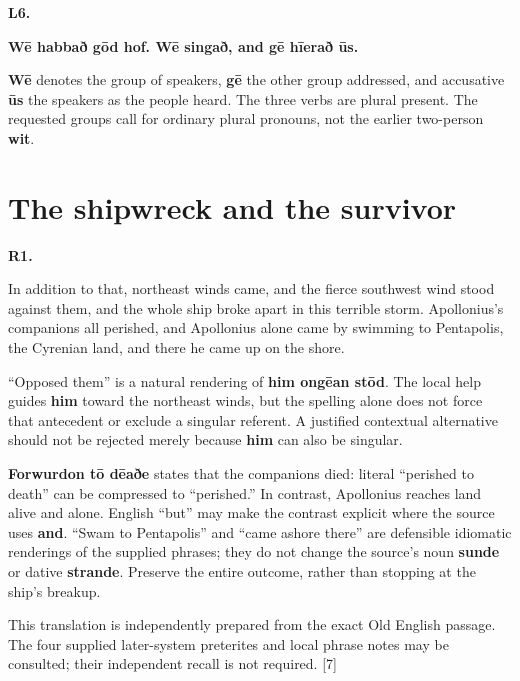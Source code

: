 \par\begin{minipage}{\linewidth}\raggedright
\textbf{L6.}

\textbf{Wē habbað gōd hof. Wē singað, and gē hīerað ūs.}

\textbf{Wē} denotes the group of speakers, \textbf{gē} the other group addressed, and accusative \textbf{ūs} the speakers as the people heard. The three verbs are plural present. The requested groups call for ordinary plural pronouns, not the earlier two-person \textbf{wit}.

\end{minipage}\par\addvspace{4pt}

\section*{The shipwreck and the survivor}

\par\begin{minipage}{\linewidth}\raggedright
\textbf{R1.}

In addition to that, northeast winds came, and the fierce southwest wind stood against them, and the whole ship broke apart in this terrible storm. Apollonius's companions all perished, and Apollonius alone came by swimming to Pentapolis, the Cyrenian land, and there he came up on the shore.

“Opposed them” is a natural rendering of \textbf{him ongēan stōd}. The local help guides \textbf{him} toward the northeast winds, but the spelling alone does not force that antecedent or exclude a singular referent. A justified contextual alternative should not be rejected merely because \textbf{him} can also be singular.

\textbf{Forwurdon tō dēaðe} states that the companions died: literal “perished to death” can be compressed to “perished.” In contrast, Apollonius reaches land alive and alone. English “but” may make the contrast explicit where the source uses \textbf{and}. “Swam to Pentapolis” and “came ashore there” are defensible idiomatic renderings of the supplied phrases; they do not change the source's noun \textbf{sunde} or dative \textbf{strande}. Preserve the entire outcome, rather than stopping at the ship's breakup.

This translation is independently prepared from the exact Old English passage. The four supplied later-system preterites and local phrase notes may be consulted; their independent recall is not required. [7]

\end{minipage}\par\addvspace{4pt}

